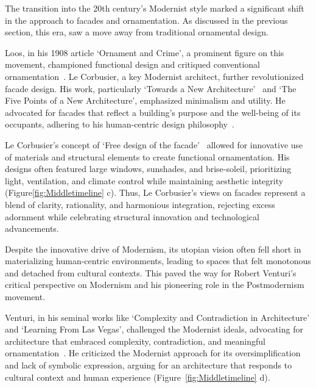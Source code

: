 
The transition into the 20th century's Modernist style marked a significant shift in the approach to facades and ornamentation.
As discussed in the previous section, this era, saw a move away from traditional ornamental design.

Loos, in his 1908 article `Ornament and Crime', a prominent figure on this movement, championed functional design and critiqued conventional ornamentation~\cite{Saglam2014}.
Le Corbusier, a key Modernist architect, further revolutionized facade design.
His work, particularly `Towards a New Architecture'~\cite{Studio2a2023} and `The Five Points of a New Architecture', emphasized minimalism and utility.
He advocated for facades that reflect a building's purpose and the well-being of its occupants, adhering to his human-centric design philosophy~\cite{Virseda2021}.

Le Corbusier's concept of `Free design of the facade'~\cite{Corbusier1986} allowed for innovative use of materials and structural elements to create functional ornamentation.
His designs often featured large windows, sunshades, and brise-soleil, prioritizing light, ventilation, and climate control while maintaining aesthetic integrity (Figure\ref{fig:Middletimeline} c).
Thus, Le Corbusier's views on facades represent a blend of clarity, rationality, and harmonious integration, rejecting excess adornment while celebrating structural innovation and technological advancements.


Despite the innovative drive of Modernism, its utopian vision often fell short in materializing human-centric environments, leading to spaces that felt monotonous and detached from cultural contexts.
This paved the way for Robert Venturi's critical perspective on Modernism and his pioneering role in the Postmodernism movement.

Venturi, in his seminal works like `Complexity and Contradiction in Architecture' and `Learning From Las Vegas', challenged the Modernist ideals, advocating for architecture that embraced complexity, contradiction, and meaningful ornamentation~\cite{Venturi1977}.
He criticized the Modernist approach for its oversimplification and lack of symbolic expression, arguing for an architecture that responds to cultural context and human experience (Figure~\ref{fig:Middletimeline} d).



